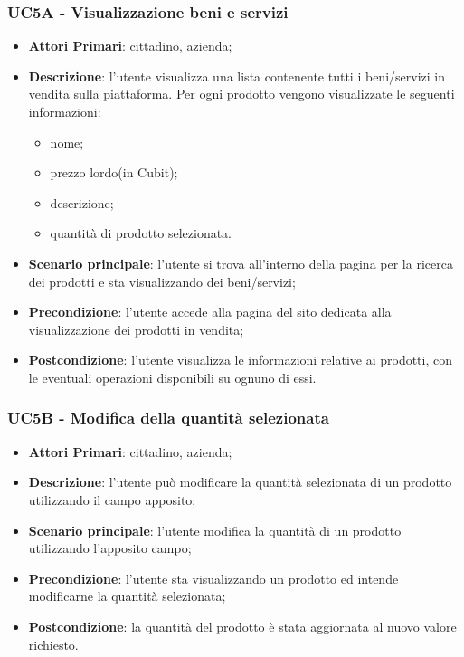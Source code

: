  \subsubsection{UC5A - Visualizzazione beni e servizi}
 

 \begin{itemize}
 	\item \textbf{Attori Primari}: cittadino, azienda;
 	\item \textbf{Descrizione}: l'utente visualizza una lista contenente tutti i beni/servizi in vendita sulla piattaforma. Per ogni prodotto vengono visualizzate le seguenti informazioni:
 	\begin{itemize}
 		\item nome;
 		\item prezzo lordo\glosp (in Cubit\glo);
 		\item descrizione;
 		\item quantità di prodotto selezionata.
 	\end{itemize}
 	
 	\item \textbf{Scenario principale}: l'utente si trova all'interno della pagina per la ricerca dei prodotti e sta visualizzando dei beni/servizi;	
 	\item \textbf{Precondizione}: l'utente accede alla pagina del sito dedicata alla visualizzazione dei prodotti in vendita;
 	\item \textbf{Postcondizione}: l'utente visualizza le informazioni relative ai prodotti, con le eventuali operazioni disponibili su ognuno di essi.
 \end{itemize}

 \subsubsection{UC5B - Modifica della quantità selezionata}
 \begin{itemize}
 	\item \textbf{Attori Primari}: cittadino, azienda;
 	\item \textbf{Descrizione}: l'utente può modificare la quantità selezionata di un prodotto utilizzando il campo apposito;
 	\item \textbf{Scenario principale}: l'utente modifica la quantità di un prodotto utilizzando l'apposito campo;
 	\item \textbf{Precondizione}: l'utente sta visualizzando un prodotto ed intende modificarne la quantità selezionata;
 	\item \textbf{Postcondizione}: la quantità del prodotto è stata aggiornata al nuovo valore richiesto.
 \end{itemize}

